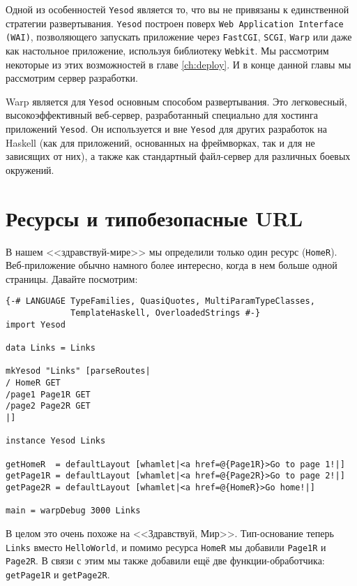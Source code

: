 Одной из особенностей \texttt{Yesod} является то, что вы не привязаны к единственной
стратегии развертывания. \texttt{Yesod} построен поверх \texttt{Web Application Interface
  (WAI)}, позволяющего запускать приложение через \texttt{FastCGI}, \texttt{SCGI},
\texttt{Warp} или даже как настольное приложение, используя библиотеку \texttt{Webkit}. Мы
рассмотрим некоторые из этих возможностей в главе \ref{ch:deploy}. И в конце данной главы
мы рассмотрим сервер разработки.

Warp является для \texttt{Yesod} основным способом развертывания. Это легковесный,
высокоэффективный веб-сервер, разработанный специально для хостинга приложений
\texttt{Yesod}. Он используется и вне \texttt{Yesod} для других разработок на
Haskell (как для приложений, основанных на фреймворках, так и для не зависящих от них), а
также как стандартный файл-сервер для различных боевых окружений.

\section{Ресурсы и типобезопасные URL}

В нашем <<здравствуй-мире>> мы определили только один ресурс
(\lstinline!HomeR!). Веб-приложение обычно намного более интересно, когда в нем больше
одной страницы. Давайте посмотрим:

\begin{lstlisting}
{-# LANGUAGE TypeFamilies, QuasiQuotes, MultiParamTypeClasses,
             TemplateHaskell, OverloadedStrings #-}
import Yesod

data Links = Links

mkYesod "Links" [parseRoutes|
/ HomeR GET
/page1 Page1R GET
/page2 Page2R GET
|]

instance Yesod Links

getHomeR  = defaultLayout [whamlet|<a href=@{Page1R}>Go to page 1!|]
getPage1R = defaultLayout [whamlet|<a href=@{Page2R}>Go to page 2!|]
getPage2R = defaultLayout [whamlet|<a href=@{HomeR}>Go home!|]

main = warpDebug 3000 Links
\end{lstlisting}

В целом это очень похоже на <<Здравствуй, Мир>>. Тип-основание теперь \lstinline!Links!
вместо \lstinline!HelloWorld!, и помимо ресурса \lstinline!HomeR! мы добавили
\lstinline!Page1R! и \lstinline!Page2R!. В связи с этим мы также добавили ещё две
функции-обработчика: \lstinline!getPage1R! и \lstinline!getPage2R!.

